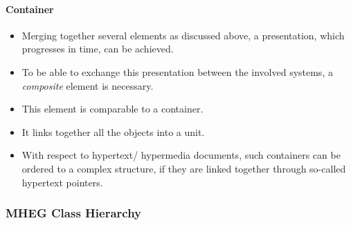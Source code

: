 \begin{multicols}{2}
	\paragraph*{Container}
	\begin{itemize}
		\item Merging together several elements as discussed above, a presentation,	which progresses in time, can be achieved. 
		\item To be able to exchange this presentation between the involved systems, a \textit{composite} element is necessary. 
		\item This element is comparable to a container. 
		\item It links together all the	objects into a unit. 
		\item With respect to hypertext/ hypermedia documents, such	containers can be ordered to a complex structure, if they are linked together through so-called hypertext pointers.
	\end{itemize}
\end{multicols}


\subsubsection{MHEG Class Hierarchy}

